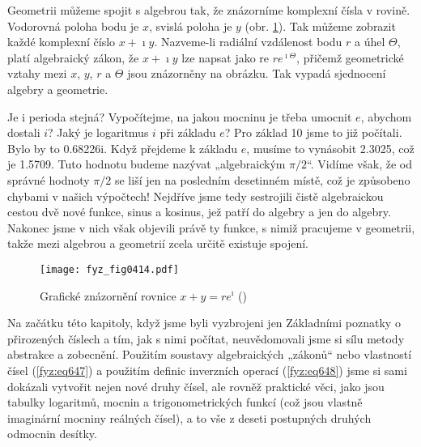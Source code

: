     Geometrii můžeme spojit s algebrou tak, že znázorníme komplexní čísla v rovině. Vodorovná poloha
    bodu je \(x\), svislá poloha je \(y\) (obr. \ref{fyz:fig0414}). Tak můžeme zobrazit každé
    komplexní číslo \(x + \imath y\). Nazveme-li radiální vzdálenost bodu \(r\) a úhel
    \(\varTheta\), platí algebraický zákon, že \(x + \imath y\) lze napsat jako re
    \(re^{\imath\varTheta}\), přičemž geometrické vztahy mezi \(x\), \(y\), \(r\) a \(\varTheta\)
    jsou znázorněny na obrázku. Tak vypadá sjednocení algebry a geometrie.

    Je i perioda stejná? Vypočítejme, na jakou mocninu je třeba umocnit \(e\), abychom dostali
    \(i\)? Jaký je logaritmus \(i\) při základu \(e\)? Pro základ \num{10} jsme to již počítali.
    Bylo by to \num{0.68226i}. Když přejdeme k základu \(e\), musíme to vynásobit \num{2.3025}, což
    je \num{1.5709}. Tuto hodnotu budeme nazývat „algebraickým \(\pi/2\)“. Vidíme však, že od
    správné hodnoty \(\pi/2\) se liší jen na posledním desetinném místě, což je způsobeno chybami v
    našich výpočtech! Nejdříve jsme tedy sestrojili čistě algebraickou cestou dvě nové funkce, sinus
    a kosinus, jež patří do algebry a jen do algebry. Nakonec jsme v nich však objevili právě ty
    funkce, s nimiž pracujeme v geometrii, takže mezi algebrou a geometrií zcela určitě existuje
    spojení.

    \begin{figure}[ht!] %
      \centering
      \texttt{[image: fyz\_fig0414.pdf]}
      \caption{Grafické znázornění rovnice \(x + y = re^\imath\) (\cite[s.~306]{Feynman01})}
      \label{fyz:fig0414}
    \end{figure}

    Na začátku této kapitoly, když jsme byli vyzbrojeni jen Základními poznatky o přirozených
    číslech a tím, jak s nimi počítat, neuvědomovali jsme si sílu metody abstrakce a zobecnění.
    Použitím soustavy algebraických „zákonů“ nebo vlastností čísel (\ref{fyz:eq647}) a použitím
    deﬁnic inverzních operací (\ref{fyz:eq648}) jsme si sami dokázali vytvořit nejen nové druhy
    čísel, ale rovněž praktické věci, jako jsou tabulky logaritmů, mocnin a trigonometrických funkcí
    (což jsou vlastně imaginární mocniny reálných čísel), a to vše z deseti postupných druhých
    odmocnin desítky.


